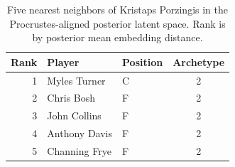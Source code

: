 \begin{table}[htbp]
  \centering\small
  \begin{tabular}{rllc}
    \toprule
    Rank & Player & Position & Archetype \\
    \midrule
    1 & Myles Turner & C & 2 \\
    2 & Chris Bosh & F & 2 \\
    3 & John Collins & F & 2 \\
    4 & Anthony Davis & F & 2 \\
    5 & Channing Frye & F & 2 \\
    \bottomrule
  \end{tabular}
  \caption{Five nearest neighbors of Kristaps Porzingis in the Procrustes-aligned posterior latent space. Rank is by posterior mean embedding distance.}
  \label{tab:Kristaps_Porzingis_neighbors}
\end{table}

